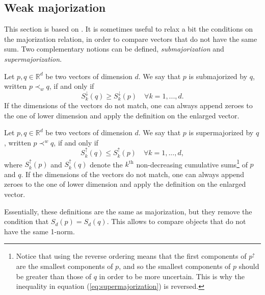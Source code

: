 \setcounter{equation}{0}

\subsection{Weak majorization}

This section is based on \cite[pp. 10--15]{marshall_inequalities_2011}. It is sometimes useful to relax a bit the conditions on the majorization relation, in order to compare vectors that do not have the same sum. Two complementary notions can be defined, \textit{submajorization} and \textit{supermajorization}.

\begin{appendix_definition}[Submajorization] \label{def:submajorization}
    Let $p, q \in \mathbb{R}^d$ be two vectors of dimension $d$. We say that $p$ is submajorized by $q$, written $p \prec_w q$, if and only if
    \begin{equation} \label{eq:submajorization}
            S^\downarrow_k (q) \geq S^\downarrow_k (p) \quad \forall k = 1,...,d.
    \end{equation}
If the dimensions of the vectors do not match, one can always append zeroes to the one of lower dimension and apply the definition on the enlarged vector.
\end{appendix_definition}

\begin{appendix_definition}[Supermajorization] \label{def:supermajorization}
    Let $p, q \in \mathbb{R}^d$ be two vectors of dimension $d$. We say that $p$ is supermajorized by $q$, written $p \prec^w q$, if and only if
    \begin{equation} \label{eq:supermajorization}
            S^\uparrow_k (q) \leq S^\uparrow_k (p) \quad \forall k = 1,...,d,
    \end{equation}
where $S^\uparrow_k(p)$ and $S^\uparrow_k (q)$ denote the $k^\text{th}$ non-decreasing cumulative sums\footnote{Notice that using the reverse ordering means that the first components of $p^\uparrow$ are the smallest components of $p$, and so the smallest components of $p$ should be greater than those of $q$ in order to be more uncertain. This is why the inequality in equation (\ref{eq:supermajorization}) is reversed.} of $p$ and $q$. If the dimensions of the vectors do not match, one can always append zeroes to the one of lower dimension and apply the definition on the enlarged vector.
\end{appendix_definition}

Essentially, these definitions are the same as majorization, but they remove the condition that $S_d(p) = S_d(q)$. This allows to compare objects that do not have the same 1-norm.




